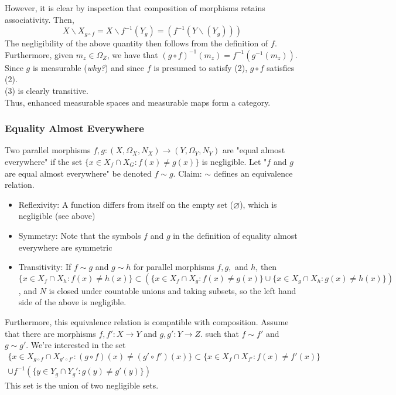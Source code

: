 \documentclass{article}
\begin{document}
However, it is clear by inspection that composition of morphisms retains associativity.
Then,
\begin{equation*}
    X\backslash{}X_{g\circ{}f} = X\backslash{}f^{-1}(Y_g) = (f^{-1}(Y\backslash(Y_g)))
\end{equation*}
The negligibility of the above quantity then follows from the definition of $f$.\\
Furthermore, given $m_z\in\Omega_Z$, we have that $(g\circ{}f)^{-1}(m_z) = f^{-1}(g^{-1}(m_z))$.  Since $g$ is measurable (\textit{why?}) and since $f$ is presumed to satisfy (2), $g\circ{}f$ satisfies (2).\\(3) is clearly transitive.\\Thus, enhanced measurable spaces and measurable maps form a category.
\subsubsection{Equality Almost Everywhere}
Two parallel morphisms $f,g: (X,\Omega_X, N_X)\rightarrow{}(Y,\Omega_Y,N_Y)$ are "equal almost everywhere" if the set $\{x\in X_f\cap{}X_G : f(x)\neq{}g(x)\}$ is negligible.  Let "$f$ and $g$ are equal almost everywhere" be denoted $f\sim{}g$.  Claim: $\sim$ defines an equivalence relation.
\begin{itemize}
    \item Reflexivity: A function differs from itself on the empty set ($\varnothing$), which is negligible (see above)
    \item Symmetry: Note that the symbols $f$ and $g$ in the definition of equality almost everywhere are symmetric
    \item Transitivity: If $f\sim{}g$ and $g\sim{}h$ for parallel morphisms $f,g,$ and $h$, then 
    \begin{equation*}
    \{x\in X_f\cap{}X_h:f(x)\neq h(x)\}\subset{}(\{x\in X_f\cap{}X_g: f(x)\neq g(x)\}\cup{}\{x\in{}X_g\cap{}X_h: g(x)\neq{}h(x)\})
    \end{equation*}, and $N$ is closed under countable unions and taking subsets, so the left hand side of the above is negligible.
\end{itemize}
Furthermore, this equivalence relation is compatible with composition.  Assume that there are morphisms $f,f': X\rightarrow{}Y$ and $g,g': Y\rightarrow{}Z$. such that $f\sim{}f'$ and $g\sim{}g'$.  We're interested in the set
\begin{multline*}
    \{ x\in{}X_{g\circ{}f}\cap X_{g'\circ{}f'} : (g\circ{}f)(x)\neq(g'\circ{}f')(x) \} \subset{} \{x\in{}X_f\cap{}X_{f'} : f(x)\neq{}f'(x)\}\\ \cup{}f^{-1}(\{y\in{}Y_g\cap{}Y_g': g(y)\neq{}g'(y)\})
\end{multline*}
This set is the union of two negligible sets.
\end{document}
